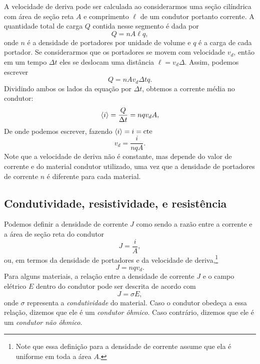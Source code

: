 A velocidade de deriva pode ser calculada ao considerarmos uma seção cilíndrica com área de seção reta $A$ e comprimento $\ell$ de um condutor portanto corrente. A quantidade total de carga $Q$ contida nesse segmento é dada por
\begin{equation}
    Q = n A \ell q,
\end{equation}
%
onde $n$ é a densidade de portadores por unidade de volume e $q$ é a carga de cada portador. Se considerarmos que os portadores se movem com velocidade $v_d$, então em um tempo $\Delta t$ eles se deslocam uma distância $\ell = v_d \Delta$. Assim, podemos escrever
\begin{equation}
    Q = nA v_d \Delta t q.
\end{equation}
%
Dividindo ambos os lados da equação por $\Delta t$, obtemos a corrente média no condutor:
\begin{equation}
    \left\langle{i}\right\rangle = \frac{Q}{\Delta t} = nqv_d A,
\end{equation}
%
De onde podemos escrever, fazendo $\left\langle{i}\right\rangle = i = \text{cte}$
\begin{equation}
    v_d = \frac{i}{nqA}.
\end{equation}
%
Note que a velocidade de deriva não é constante, mas depende do valor de corrente e do material condutor utilizado, uma vez que a densidade de portadores de corrente $n$ é diferente para cada material.

\subsection{Condutividade, resistividade, e resistência}

Podemos definir a densidade de corrente $J$ como sendo a razão entre a corrente e a área de seção reta do condutor
\begin{equation}
    J = \frac{i}{A},
\end{equation}
%
ou, em termos da densidade de portadores e da velocidade de deriva,\footnote{Note que essa definição para a densidade de corrente assume que ela é uniforme em toda a área $A$.}
\begin{equation}
    J = nqv_d.
\end{equation}
%
Para alguns materiais, a relação entre a densidade de corrente $J$ e o campo elétrico $E$ dentro do condutor pode ser descrita de acordo com
\begin{equation}
    J = \sigma E,
\end{equation}
%
onde $\sigma$ representa a \emph{condutividade} do material. Caso o condutor obedeça a essa relação, dizemos que ele é um \emph{condutor ôhmico}. Caso contrário, dizemos que ele é um \emph{condutor não ôhmico}.

